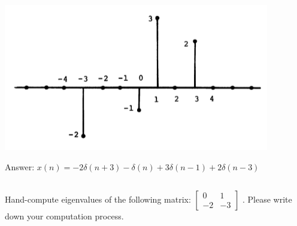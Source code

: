 \documentclass[12pt]{article}
\begin{document}
\includegraphics{images/2-5-Signal.png}

\color{blue}
Answer: $x(n) = -2 \delta(n + 3) - \delta(n) + 3 \delta(n - 1) + 2 \delta(n - 3)$

\color{black}
\subsection{}
Hand-compute eigenvalues of the following matrix:
$\begin{bmatrix}
    0 & 1 \\
    -2 & -3
\end{bmatrix}$
. Please write down your computation process.
\end{document}
